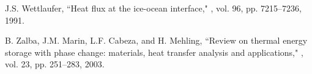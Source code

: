 \documentclass[journal]{IEEEtran}
\begin{document}
\begin{thebibliography}{99}
J.S. Wettlaufer,
\newblock ``Heat flux at the ice-ocean interface,"
, vol. 96, pp. 7215--7236, 1991.

B. Zalba, J.M. Marin, L.F. Cabeza, and H. Mehling,
\newblock ``Review on thermal energy storage with phase change: materials, heat transfer analysis and applications,"
, vol. 23, pp. 251--283, 2003.

  

  
  
 

 
 
  
  
  
  
  
   

   
    

  

     
\end{thebibliography}
\end{document}
